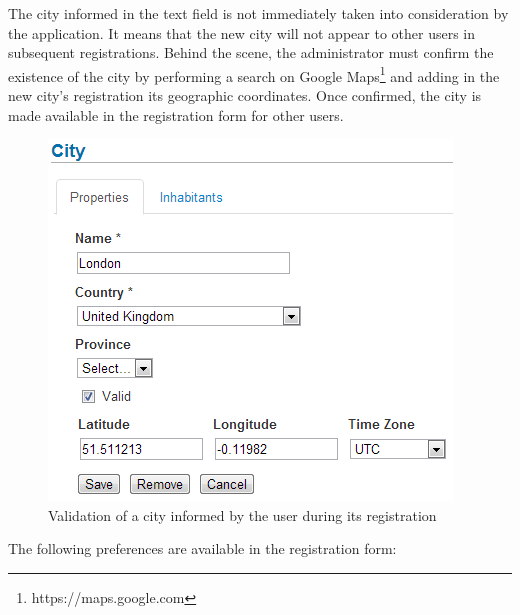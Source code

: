 \documentclass[envcountsame,envcountchap]{svmono}
\begin{document}
The city informed in the text field is not immediately taken into consideration by the application. It means that the new city will not appear to other users in subsequent registrations. Behind the scene, the administrator must confirm the existence of the city by performing a search on Google Maps\footnote{https://maps.google.com} and adding in the new city's registration its geographic coordinates. Once confirmed, the city is made available in the registration form for other users.

\begin{figure}
\centering
\includegraphics[scale=0.9]{figures/location-city-validation}
\caption{Validation of a city informed by the user during its registration}
\label{fig:location-city-validation}
\end{figure}

The following preferences are available in the registration form:
\end{document}

